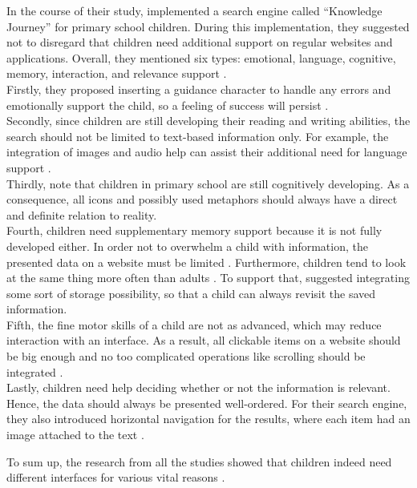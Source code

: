 In the course of their study, \textcite{gossen2012search} implemented a search engine called ``Knowledge Journey'' for primary school children. During this implementation, they suggested not to disregard that children need additional support on regular websites and applications. Overall, they mentioned six types: emotional, language, cognitive, memory, interaction, and relevance support \autocite{gossen2012search}. \\
Firstly, they proposed inserting a guidance character to handle any errors and emotionally support the child, so a feeling of success will persist \autocite{gossen2012search}.\\
Secondly, since children are still developing their reading and writing abilities, the search should not be limited to text-based information only. For example, the integration of images and audio help can assist their additional need for language support \autocite{gossen2012search}.\\
Thirdly, \textcite{gossen2012search} note that children in primary school are still cognitively developing. As a consequence, all icons and possibly used metaphors should always have a direct and definite relation to reality. \\
Fourth, children need supplementary memory support because it is not fully developed either. In order not to overwhelm a child with information, the presented data on a website must be limited \autocite{gossen2012search}. Furthermore, children tend to look at the same thing more often than adults \autocite{gossen2012search}. To support that, \textcite{gossen2012search} suggested integrating some sort of storage possibility, so that a child can always revisit the saved information.\\
Fifth, the fine motor skills of a child are not as advanced, which may reduce interaction with an interface. As a result, all clickable items on a website should be big enough and no too complicated operations like scrolling should be integrated \autocite{gossen2012search}.\\
Lastly, children need help deciding whether or not the information is relevant. Hence, the data should always be presented well-ordered. For their search engine, they also introduced horizontal navigation for the results, where each item had an image attached to the text \autocite{gossen2012search}.

To sum up, the research from all the studies showed that children indeed need different interfaces for various vital reasons \autocite{sharmin2012effect, gossen2012search, kermani2015preparing, adattil2018effects}.

